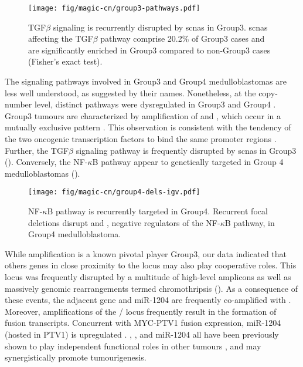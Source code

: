 \begin{SCfigure}[5][b]
	\centering
	\texttt{[image: fig/magic-cn/group3-pathways.pdf]}
	\caption[TGF$\beta$ signaling is recurrently disrupted by \gls{scnas} in Group3]
	{
	TGF$\beta$ signaling is recurrently disrupted by \gls{scnas} in Group3.
	\gls{scnas} affecting the TGF$\beta$ pathway comprise 20.2\% of Group3 cases and are significantly enriched in Group3 compared to non-Group3 cases (Fisher's exact test).
	}
	\label{fig:group3-pathways}
\end{SCfigure}

The signaling pathways involved in Group3 and Group4 medulloblastomas are less well understood, as suggested by their names. Nonetheless, at the copy-number level, distinct pathways were dysregulated in Group3 and Group4 . Group3 tumours are characterized by amplification of  and , which occur in a mutually exclusive pattern . This observation is consistent with the tendency of the two oncogenic transcription factors to bind the same promoter regions . Further, the TGF$\beta$ signaling pathway is frequently disrupted by \gls{scnas} in Group3 (). Conversely, the NF-$\kappa$B pathway appear to genetically targeted in Group 4 medulloblastomas ().

\begin{SCfigure}[2]
	\centering
	\texttt{[image: fig/magic-cn/group4-dels-igv.pdf]}
	\caption[NF-$\kappa$B pathway is recurrently targeted in Group4]
	{
	NF-$\kappa$B pathway is recurrently targeted in Group4.
	Recurrent focal deletions disrupt  and , negative regulators of the NF-$\kappa$B pathway, in Group4 medulloblastoma.
	}
	\label{fig:group4-dels-igv}
\end{SCfigure}

While  amplification is a known pivotal player Group3, our data indicated that others genes in close proximity to the  locus may also play cooperative roles. This locus was frequently disrupted by a multitude of high-level amplicons  as well as massively genomic rearrangements termed chromothripsis (). As a consequence of these events, the adjacent  gene and miR-1204 are frequently co-amplified with . Moreover, amplifications of the / locus frequently result in the formation of fusion transcripts. Concurrent with MYC-PTV1 fusion expression, miR-1204 (hosted in PTV1) is upregulated . , , and miR-1204 all have been previously shown to play independent functional roles in other tumours , and may synergistically promote tumourigenesis.

